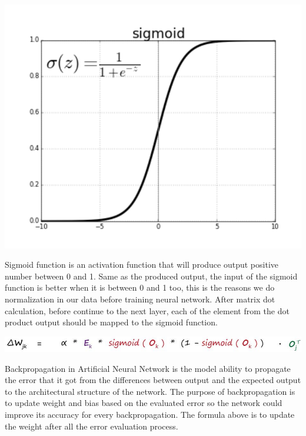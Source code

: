 \documentclass[a4paper, 12pt]{article}
\begin{document}
\begin{multicols}{2}
\centering
\vspace{0.2cm}
\includegraphics[scale=0.55]{sigmoid}
\vspace{0.2cm}

\justifying
  Sigmoid function is an activation function that will produce output positive number between 0 and 1. Same as the produced output, the input of the sigmoid function is better when it is between 0 and 1 too, this is the reasons we do normalization in our data before training neural network. After matrix dot calculation, before continue to the next layer, each of the element from the dot product output should be mapped to the sigmoid function. \cite{sibi2013} 

\centering
\vspace{0.2cm}
\includegraphics[scale=0.2]{delta_w}
\vspace{0.2cm}

\justifying
  Backpropagation in Artificial Neural Network is the model ability to propagate the error that it got from the differences between output and the expected output to the architectural structure of the network. The purpose of backpropagation is to update weight and bias based on the evaluated error so the network could improve its accuracy for every backpropagation. The formula above is to update the weight after all the error evaluation process. \cite{erb1993}


\end{multicols}
\end{document}
